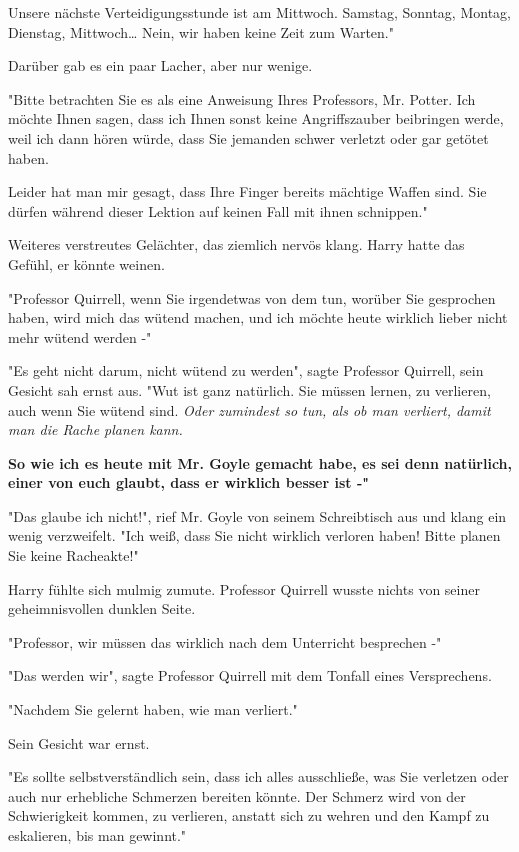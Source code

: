 {Unsere nächste Verteidigungsstunde ist am Mittwoch. Samstag, Sonntag, Montag, Dienstag, Mittwoch… Nein, wir haben keine Zeit zum Warten."

Darüber gab es ein paar Lacher, aber nur wenige.

"Bitte betrachten Sie es als eine Anweisung Ihres Professors, Mr. Potter. Ich möchte Ihnen sagen, dass ich Ihnen sonst keine Angriffszauber beibringen werde, weil ich dann hören würde, dass Sie jemanden schwer verletzt oder gar getötet haben.

Leider hat man mir gesagt, dass Ihre Finger bereits mächtige Waffen sind. Sie dürfen während dieser Lektion auf keinen Fall mit ihnen schnippen."

Weiteres verstreutes Gelächter, das ziemlich nervös klang. Harry hatte das Gefühl, er könnte weinen.

"Professor Quirrell, wenn Sie irgendetwas von dem tun, worüber Sie gesprochen haben, wird mich das wütend machen, und ich möchte heute wirklich lieber nicht mehr wütend werden -"

"Es geht nicht darum, nicht wütend zu werden", sagte Professor Quirrell, sein Gesicht sah ernst aus. "Wut ist ganz natürlich. Sie müssen lernen, zu verlieren, auch wenn Sie wütend sind. \emph{Oder zumindest so tun, als ob man verliert, damit man die Rache planen kann.}

\textbf{So wie ich es heute mit Mr. Goyle gemacht habe, es sei denn natürlich, einer von euch glaubt, dass er wirklich besser ist -"}

"Das glaube ich nicht!", rief Mr. Goyle von seinem Schreibtisch aus und klang ein wenig verzweifelt. "Ich weiß, dass Sie nicht wirklich verloren haben! Bitte planen Sie keine Racheakte!"

Harry fühlte sich mulmig zumute. Professor Quirrell wusste nichts von seiner geheimnisvollen dunklen Seite.

"Professor, wir müssen das wirklich nach dem Unterricht besprechen -"

"Das werden wir", sagte Professor Quirrell mit dem Tonfall eines Versprechens.

"Nachdem Sie gelernt haben, wie man verliert."

Sein Gesicht war ernst.

"Es sollte selbstverständlich sein, dass ich alles ausschließe, was Sie verletzen oder auch nur erhebliche Schmerzen bereiten könnte. Der Schmerz wird von der Schwierigkeit kommen, zu verlieren, anstatt sich zu wehren und den Kampf zu eskalieren, bis man gewinnt."

}
